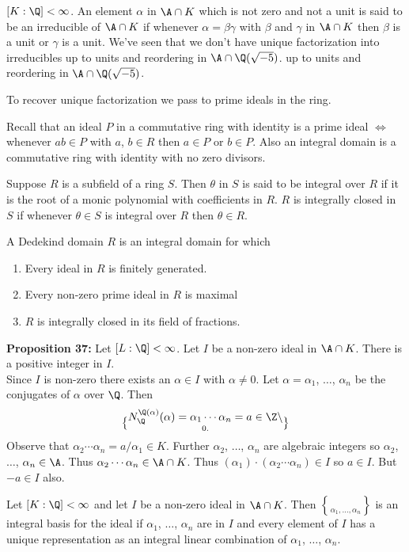 $[K:\Q]<\infty$.  An element $\alpha$ in $\A\cap K$ which is not zero and not a unit is said to be an irreducible of $\A\cap K$ if whenever $\alpha=\beta\gamma$ with $\beta$ and $\gamma$ in $\A\cap K$ then $\beta$ is a unit or $\gamma$ is a unit.  We've seen that we don't
have unique factorization into irreducibles up to units and reordering in $\A\cap\Q(\sqrt{-5})$.
up to units and reordering in $\A\cap\Q(\sqrt{-5})$.

To recover unique factorization we pass to prime ideals in the ring.

Recall that an ideal $P$ in a commutative ring with identity is a prime ideal $\iff$ whenever $ab\in P$ with $a$, $b\in R$ then $a\in P$ or $b\in P$.  Also an integral domain is a commutative ring with identity with no zero divisors.

Suppose $R$ is a subfield of a ring $S$.  Then $\theta$ in $S$ is said to be integral over $R$ if it is the root of a monic polynomial with coefficients in $R$.  $R$ is integrally closed in $S$ if whenever $\theta\in S$ is integral over $R$ then $\theta\in R$.

 A Dedekind domain $R$ is an integral domain for which
\begin{enumerate}
\item Every ideal in $R$ is finitely generated.
\item Every non-zero prime ideal in $R$ is maximal
\item $R$ is integrally closed in its field of fractions.
\end{enumerate}
\textbf{Proposition 37:} Let $[L:\Q]<\infty$.  Let $I$ be a non-zero ideal in $\A\cap K$.  There is a positive integer in $I$. \\
\pf Since $I$ is non-zero there exists an $\alpha\in I$ with $\alpha\neq0$.  Let $\alpha=\alpha_1$, $\dotsc$, $\alpha_n$ be the conjugates of $\alpha$ over $\Q$.  Then
\[ N_\Q^{\Q(\alpha)}(\alpha) = \alpha_1\dotsm\alpha_n = a \in \Z\setminus\brace0 . \]
Observe that $\alpha_2\dotsm\alpha_n=a/\alpha_1\in K$.  Further $\alpha_2$, $\dotsc$, $\alpha_n$ are algebraic integers so $\alpha_2$, $\dotsc$, $\alpha_n\in\A$.  Thus $\alpha_2\dotsm\alpha_n\in\A\cap K$.  Thus $(\alpha_1)\cdot(\alpha_2\dotsm\alpha_n)\in I$ so $a\in I$.  But $-a\in I$ also.

 Let $[K:\Q]<\infty$ and let $I$ be a non-zero ideal in $\A\cap K$.  Then $\brace{\alpha_1,\dotsc,\alpha_n}$ is an integral basis for the ideal if $\alpha_1$, $\dotsc$, $\alpha_n$ are in $I$ and every element of $I$ has a unique representation as an integral linear combination of $\alpha_1$, $\dotsc$, $\alpha_n$.